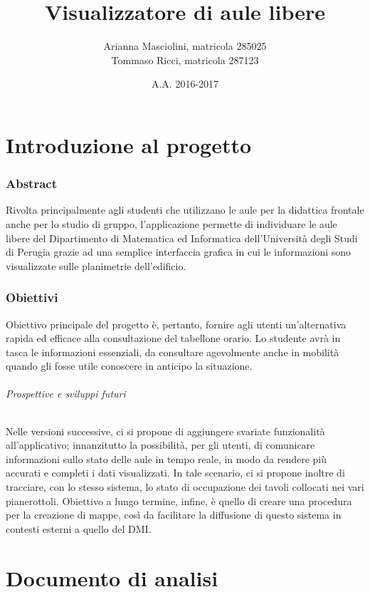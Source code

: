 \documentclass{article}
\title{{\huge Visualizzatore di aule libere}}
\author{Arianna Masciolini, matricola 285025\\ Tommaso Ricci, matricola 287123}
\date{A.A. 2016-2017}
\begin{document}
	\maketitle
	\newpage
	\tableofcontents
	\newpage
	\part{Introduzione al progetto}
	\section{Abstract}
	Rivolta principalmente agli studenti che utilizzano le aule per la didattica frontale anche per lo studio di gruppo, l'applicazione permette di individuare le aule libere del Dipartimento di Matematica ed Informatica dell'Università degli Studi di Perugia grazie ad una semplice interfaccia grafica in cui le informazioni sono visualizzate sulle planimetrie dell'edificio.
	\section{Obiettivi}
	Obiettivo principale del progetto è, pertanto, fornire agli utenti un'alternativa rapida ed efficace alla consultazione del tabellone orario. Lo studente avrà in tasca le informazioni essenziali, da consultare agevolmente anche in mobilità quando gli fosse utile conoscere in anticipo la situazione.
	\paragraph{Prospettive e sviluppi futuri}
	Nelle versioni successive, ci si propone di aggiungere svariate funzionalità all'applicativo; innanzitutto la possibilità, per gli utenti, di comunicare informazioni sullo stato delle aule in tempo reale, in modo da rendere più accurati e completi i dati visualizzati. In tale scenario, ci si propone inoltre di tracciare, con lo stesso sistema, lo stato di occupazione dei tavoli collocati nei vari pianerottoli. Obiettivo a lungo termine, infine, è quello di creare una procedura per la creazione di mappe, così da facilitare la diffusione di questo sistema in contesti esterni a quello del DMI.
	\newpage
	\part{Documento di analisi}
\end{document}
